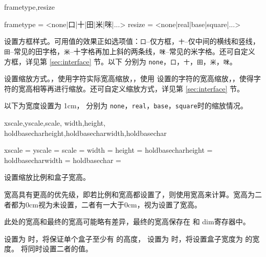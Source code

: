 \documentclass{ctxdoc}
\begin{document}
\begin{function}{frametype,resize}
  \begin{syntax}
    frametype = <none|口|十|田|米|咪|...> 
    resize    = <none|real|base|square|...> 
  \end{syntax}
   设置方框样式。可用值的效果正如选项值：\verb|口|--仅方框，\verb|十|--仅中间的横线和竖线，\verb|田|--常见的田字格，\verb|米|--十字格再加上斜的两条线，\verb|咪|--常见的米字格。还可自定义方框，详见第 \ref{sec:interface} 节。以下  分别为 \verb|none|，\verb|口|，\verb|十|，\verb|田|，\verb|米|，\verb|咪|。

  {
  }

   设置缩放方式。，使用字符实际宽高缩放，，使用  设置的字符的宽高缩放，，使得字符的宽高相等再进行缩放。还可自定义缩放方式，详见第 \ref{sec:interface} 节。

  以下为宽度设置为 1cm， 分别为 \verb|none|，\verb|real|，\verb|base|，\verb|square|时的缩放情况。

  {
  }
\end{function}

\begin{function}{
  xscale,yscale,scale,
  width,height,
  holdbasecharheight,holdbasecharwidth,holdbasechar
}
  \begin{syntax}
    xscale =  
    yscale =  
    scale  = 
    width  = 
    height = 
    holdbasecharheight = \TTF {}
    holdbasecharwidth  = \TTF {}
    holdbasechar       = \TTF
  \end{syntax}
  设置缩放比例和盒子宽高。

  宽高具有更高的优先级，即若比例和宽高都设置了，则使用宽高来计算。宽高为二者都为0cm视为未设置，二者有一大于0cm，视为设置了宽高。

  此处的宽高和最终的宽高可能略有差异，最终的宽高保存在  和  dim寄存器中。
  
  设置为  时，将保证单个盒子至少有  的高度， 设置为  时，将设置盒子宽度为  的宽度。 将同时设置二者的值。
\end{function}
\end{document}
